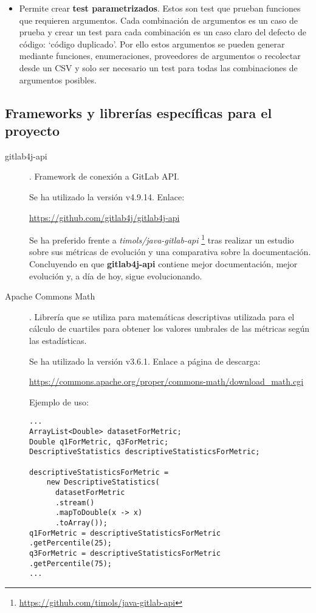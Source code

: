 \begin{description}
\begin{itemize}
			\item Permite crear \textbf{test parametrizados}. Estos son test que prueban funciones que requieren argumentos. Cada combinación de argumentos es un caso de prueba y crear un test para cada combinación es un caso claro del defecto de código: `código duplicado'. Por ello estos argumentos se pueden generar mediante funciones, enumeraciones, proveedores de argumentos o recolectar desde un CSV y solo ser necesario un test para todas las combinaciones de argumentos posibles.
		\end{itemize}
\end{description}
\subsection{Frameworks y librerías específicas para el proyecto}
\begin{description}
	\item[gitlab4j-api]. Framework de conexión a GitLab API. 
	
		Se ha utilizado la versión  v4.9.14. Enlace:
		
		\url{https://github.com/gitlab4j/gitlab4j-api}
		
		Se ha preferido frente a \textit{timols/java-gitlab-api} \footnote{\url{https://github.com/timols/java-gitlab-api}} tras realizar un estudio sobre sus métricas de evolución y una comparativa sobre la documentación. Concluyendo en que \textbf{gitlab4j-api} contiene mejor documentación, mejor evolución y, a día de hoy, sigue evolucionando.
		
	\item[Apache Commons Math]. Librería que se utiliza para matemáticas descriptivas utilizada para el cálculo de cuartiles para obtener los valores umbrales de las métricas según las estadísticas. 
	
		Se ha utilizado la versión  v3.6.1. Enlace a página de descarga:
	
		\url{https://commons.apache.org/proper/commons-math/download_math.cgi}
		
		Ejemplo de uso:
		
\begin{minipage}{\linewidth}
\begin{lstlisting}
...
ArrayList<Double> datasetForMetric;
Double q1ForMetric, q3ForMetric;
DescriptiveStatistics descriptiveStatisticsForMetric;

descriptiveStatisticsForMetric = 
	new DescriptiveStatistics(
	  datasetForMetric
	  .stream()
	  .mapToDouble(x -> x)
	  .toArray());
q1ForMetric = descriptiveStatisticsForMetric
.getPercentile(25);
q3ForMetric = descriptiveStatisticsForMetric
.getPercentile(75);
...
\end{lstlisting}
\end{minipage}		

\end{description}
